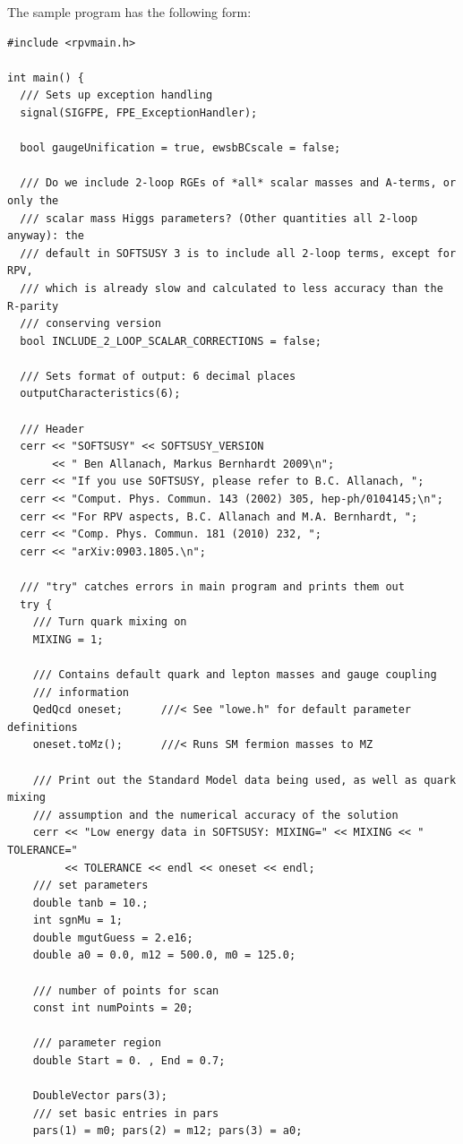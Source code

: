 \documentclass[final,3p,times,pdflatex]{elsarticle}
\begin{document}
The sample program has the following form: 
\small
\begin{verbatim}
#include <rpvmain.h>

int main() {
  /// Sets up exception handling
  signal(SIGFPE, FPE_ExceptionHandler); 

  bool gaugeUnification = true, ewsbBCscale = false;

  /// Do we include 2-loop RGEs of *all* scalar masses and A-terms, or only the
  /// scalar mass Higgs parameters? (Other quantities all 2-loop anyway): the
  /// default in SOFTSUSY 3 is to include all 2-loop terms, except for RPV,
  /// which is already slow and calculated to less accuracy than the R-parity
  /// conserving version
  bool INCLUDE_2_LOOP_SCALAR_CORRECTIONS = false;

  /// Sets format of output: 6 decimal places
  outputCharacteristics(6);

  /// Header  
  cerr << "SOFTSUSY" << SOFTSUSY_VERSION 
       << " Ben Allanach, Markus Bernhardt 2009\n";
  cerr << "If you use SOFTSUSY, please refer to B.C. Allanach, ";
  cerr << "Comput. Phys. Commun. 143 (2002) 305, hep-ph/0104145;\n";
  cerr << "For RPV aspects, B.C. Allanach and M.A. Bernhardt, ";
  cerr << "Comp. Phys. Commun. 181 (2010) 232, ";
  cerr << "arXiv:0903.1805.\n";

  /// "try" catches errors in main program and prints them out
  try {
    /// Turn quark mixing on
    MIXING = 1;

    /// Contains default quark and lepton masses and gauge coupling
    /// information 
    QedQcd oneset;      ///< See "lowe.h" for default parameter definitions 
    oneset.toMz();      ///< Runs SM fermion masses to MZ
    
    /// Print out the Standard Model data being used, as well as quark mixing
    /// assumption and the numerical accuracy of the solution
    cerr << "Low energy data in SOFTSUSY: MIXING=" << MIXING << " TOLERANCE=" 
         << TOLERANCE << endl << oneset << endl;
    /// set parameters
    double tanb = 10.;
    int sgnMu = 1;
    double mgutGuess = 2.e16; 
    double a0 = 0.0, m12 = 500.0, m0 = 125.0; 
    
    /// number of points for scan
    const int numPoints = 20; 
    
    /// parameter region
    double Start = 0. , End = 0.7;
    
    DoubleVector pars(3);
    /// set basic entries in pars
    pars(1) = m0; pars(2) = m12; pars(3) = a0;
      

\end{verbatim}
\end{document}
